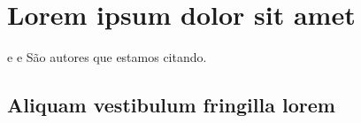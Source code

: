 \chapter{Lorem ipsum dolor sit amet}
\cite{godinho2016vida} e \cite{mello2006metodologia} e 
São autores que estamos citando.

\section{Aliquam vestibulum fringilla lorem}

\lipsum[1]

\lipsum[2-3]
